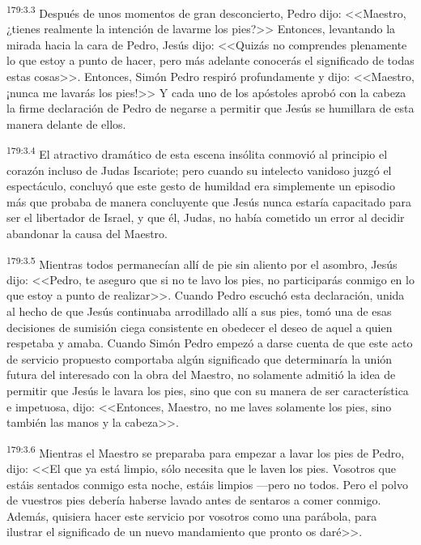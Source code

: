 \par 
\textsuperscript{179:3.3} Después de unos momentos de gran desconcierto, Pedro dijo: <<Maestro, ¿tienes realmente la intención de lavarme los pies?>> Entonces, levantando la mirada hacia la cara de Pedro, Jesús dijo: <<Quizás no comprendes plenamente lo que estoy a punto de hacer, pero más adelante conocerás el significado de todas estas cosas>>. Entonces, Simón Pedro respiró profundamente y dijo: <<Maestro, ¡nunca me lavarás los pies!>> Y cada uno de los apóstoles aprobó con la cabeza la firme declaración de Pedro de negarse a permitir que Jesús se humillara de esta manera delante de ellos.

\par 
\textsuperscript{179:3.4} El atractivo dramático de esta escena insólita conmovió al principio el corazón incluso de Judas Iscariote; pero cuando su intelecto vanidoso juzgó el espectáculo, concluyó que este gesto de humildad era simplemente un episodio más que probaba de manera concluyente que Jesús nunca estaría capacitado para ser el libertador de Israel, y que él, Judas, no había cometido un error al decidir abandonar la causa del Maestro.

\par 
\textsuperscript{179:3.5} Mientras todos permanecían allí de pie sin aliento por el asombro, Jesús dijo: <<Pedro, te aseguro que si no te lavo los pies, no participarás conmigo en lo que estoy a punto de realizar>>. Cuando Pedro escuchó esta declaración, unida al hecho de que Jesús continuaba arrodillado allí a sus pies, tomó una de esas decisiones de sumisión ciega consistente en obedecer el deseo de aquel a quien respetaba y amaba. Cuando Simón Pedro empezó a darse cuenta de que este acto de servicio propuesto comportaba algún significado que determinaría la unión futura del interesado con la obra del Maestro, no solamente admitió la idea de permitir que Jesús le lavara los pies, sino que con su manera de ser característica e impetuosa, dijo: <<Entonces, Maestro, no me laves solamente los pies, sino también las manos y la cabeza>>.

\par 
\textsuperscript{179:3.6} Mientras el Maestro se preparaba para empezar a lavar los pies de Pedro, dijo: <<El que ya está limpio, sólo necesita que le laven los pies. Vosotros que estáis sentados conmigo esta noche, estáis limpios ---pero no todos. Pero el polvo de vuestros pies debería haberse lavado antes de sentaros a comer conmigo. Además, quisiera hacer este servicio por vosotros como una parábola, para ilustrar el significado de un nuevo mandamiento que pronto os daré>>.

